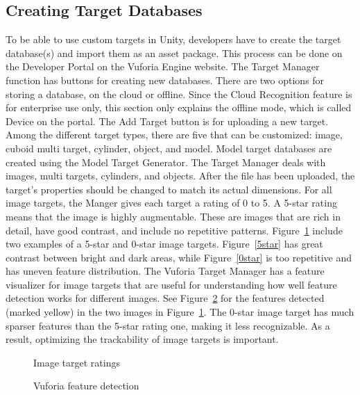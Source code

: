\subsection{Creating Target Databases}
To be able to use custom targets in Unity, developers have to create the target database(s) and import them as an asset package. This process can be done on the Developer Portal on the Vuforia Engine website. The Target Manager function has buttons for creating new databases. There are two options for storing a database, on the cloud or offline. Since the Cloud Recognition feature is for enterprise use only, this section only explains the offline mode, which is called Device on the portal. The Add Target button is for uploading a new target. Among the different target types, there are five that can be customized: image, cuboid multi target, cylinder, object, and model. Model target databases are created using the Model Target Generator. The Target Manager deals with images, multi targets, cylinders, and objects. After the file has been uploaded, the target's properties should be changed to match its actual dimensions. For all image targets, the Manger gives each target a rating of 0 to 5. A 5-star rating means that the image is highly augmentable. These are images that are rich in detail, have good contrast, and include no repetitive patterns. Figure~\ref{ratings} include two examples of a 5-star and 0-star image targets. Figure~\ref{5star} has great contrast between bright and dark areas, while Figure~\ref{0star} is too repetitive and has uneven feature distribution. The Vuforia Target Manager has a feature visualizer for image targets that are useful for understanding how well feature detection works for different images. See Figure~\ref{feature_ratings} for the features detected (marked yellow) in the two images in Figure~\ref{ratings}. The 0-star image target has much sparser features than the 5-star rating one, making it less recognizable. As a result, optimizing the trackability of image targets is important.

\begin{figure}[!ht]\centering
{}
\qquad
{}
\vspace{-.2 in}
\caption{Image target ratings}\label{ratings}
\end{figure}

\begin{figure}[!ht]\centering
{}
\qquad
{}
\vspace{-.2 in}
\caption{Vuforia feature detection}\label{feature_ratings}
\end{figure}

